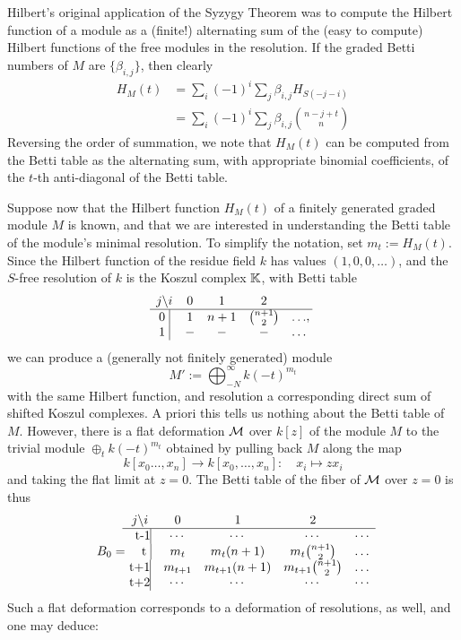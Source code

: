  Hilbert's original application of the Syzygy Theorem was to compute the Hilbert function of a module as a (finite!) alternating sum of the (easy to compute) Hilbert functions of the free modules in the resolution. If the graded Betti numbers of $M$ are $\{\beta_{i,j}\}$, then clearly
\begin{align*}
 H_{M}(t) &= \sum_{i}(-1)^{i}\sum_{j}\beta_{i,j}H_{S(-j-i)}\\
 &= \sum_{i}(-1)^{i}\sum_{j}\beta_{i,j}{n-j+t\choose n}
\end{align*}
Reversing the order of summation, we note that $H_{M}(t)$ can be computed from the Betti table as the 
alternating sum, with appropriate binomial coefficients, of the $t$-th anti-diagonal of the Betti table. 

Suppose now that the Hilbert function $H_{M}(t)$ of a finitely generated
graded module $M$ is known, and that we are interested in understanding the Betti table of the module's minimal resolution. To simplify the notation, set $m_{t} := H_{M}(t)$. Since the Hilbert function of the residue field $k$ has values $(1,0,0,\dots)$, and the $S$-free resolution of $k$ is the
Koszul complex ${\mathbb K}$, with Betti table
$$
\begin{matrix}
j \backslash i     &0&1&2\\ \hline
\text{0 }\vline &1&n+1&{n+1\choose 2}&\dots\\
\text{1 }\vline &-&-&-&\dots\\
\end{matrix},
$$
we can produce a (generally not finitely generated) module 
$$
M' := \bigoplus_{-N}^{\infty}k(-t)^{m_{t}}
$$
with the same Hilbert function, and resolution a corresponding direct sum of shifted Koszul complexes. 
A priori this tells us nothing about the Betti table of $M$. However,
there is a flat deformation ${\mathcal M}$ over $k[z]$ of the module $M$ to the trivial module 
$\oplus_{t}k(-t)^{m_{t}}$
obtained by pulling back $M$ along the map
$$
k[x_{0}\dots,x_{n}] \to k[x_{0},\dots,x_{n}]: \quad x_{i} \mapsto zx_{i}
$$
and taking the flat limit at $z=0$. 
The Betti table of the fiber of ${\mathcal M}$ over $z=0$ is thus
\begin{align*}
B_{0} =  \begin{matrix}
j \backslash i     &0&1&2\\ \hline
\text{\kern 5pt t-1}\vline &\cdots&\cdots&\cdots&\cdots\\
\text{ \kern 7pt t }\vline &m_{t}&m_{t}(n+1)&m_{t}{n+1\choose 2}&\dots\\
\text{t+1}\vline &m_{t+1}&m_{t+1}(n+1)&m_{t+1}{n+1\choose 2}&\dots\\
\text{t+2}\vline &\cdots&\cdots&\cdots&\cdots\\
\end{matrix}
\end{align*}
Such a flat deformation corresponds to a deformation of resolutions, as well, and one may deduce:

